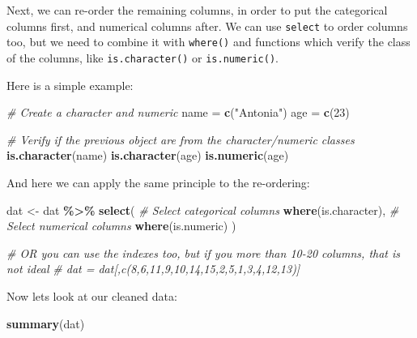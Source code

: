 \documentclass[
]{book}
\newenvironment{Shaded}{\begin{snugshade}}{\end{snugshade}}
\newcommand{\CommentTok}[1]{\textcolor[rgb]{0.56,0.35,0.01}{\textit{#1}}}
\newcommand{\DecValTok}[1]{\textcolor[rgb]{0.00,0.00,0.81}{#1}}
\newcommand{\FunctionTok}[1]{\textcolor[rgb]{0.13,0.29,0.53}{\textbf{#1}}}
\newcommand{\NormalTok}[1]{#1}
\newcommand{\OtherTok}[1]{\textcolor[rgb]{0.56,0.35,0.01}{#1}}
\newcommand{\SpecialCharTok}[1]{\textcolor[rgb]{0.81,0.36,0.00}{\textbf{#1}}}
\newcommand{\StringTok}[1]{\textcolor[rgb]{0.31,0.60,0.02}{#1}}
\begin{document}
Next, we can re-order the remaining columns, in order to put the categorical columns first, and numerical columns after. We can use \texttt{select} to order columns too, but we need to combine it with \texttt{where()} and functions which verify the class of the columns, like \texttt{is.character()} or \texttt{is.numeric()}.

Here is a simple example:

\begin{Shaded}
\begin{Highlighting}[]
\CommentTok{\# Create a character and numeric }
\NormalTok{name }\OtherTok{=} \FunctionTok{c}\NormalTok{(}\StringTok{"Antonia"}\NormalTok{)}
\NormalTok{age }\OtherTok{=} \FunctionTok{c}\NormalTok{(}\DecValTok{23}\NormalTok{)}

\CommentTok{\# Verify if the previous object are from the character/numeric classes}
\FunctionTok{is.character}\NormalTok{(name)}
\FunctionTok{is.character}\NormalTok{(age)}
\FunctionTok{is.numeric}\NormalTok{(age)}
\end{Highlighting}
\end{Shaded}

And here we can apply the same principle to the re-ordering:

\begin{Shaded}
\begin{Highlighting}[]
\NormalTok{dat }\OtherTok{\textless{}{-}}\NormalTok{ dat }\SpecialCharTok{\%\textgreater{}\%}
  \FunctionTok{select}\NormalTok{(}
    \CommentTok{\# Select categorical columns}
    \FunctionTok{where}\NormalTok{(is.character), }
    \CommentTok{\# Select numerical columns}
    \FunctionTok{where}\NormalTok{(is.numeric)}
\NormalTok{  )}

\CommentTok{\# OR you can use the indexes too, but if you more than 10{-}20 columns, that is not ideal}
\CommentTok{\# dat = dat[,c(8,6,11,9,10,14,15,2,5,1,3,4,12,13)]}
\end{Highlighting}
\end{Shaded}

Now lets look at our cleaned data:

\begin{Shaded}
\begin{Highlighting}[]
\FunctionTok{summary}\NormalTok{(dat)}
\end{Highlighting}
\end{Shaded}
\end{document}
